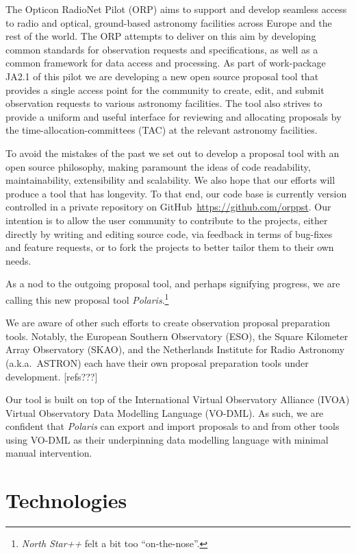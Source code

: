\documentclass[11pt,twoside]{article}
\begin{document}
The Opticon RadioNet Pilot (ORP) aims to support and develop seamless access to radio and optical,
ground-based astronomy facilities across Europe and the rest of the world.
The ORP attempts to deliver on this aim by developing common standards for observation requests and
specifications, as well as a common framework for data access and processing.
As part of work-package JA2.1 of this pilot we are developing a new open source proposal tool that provides
a single access point for the community to create, edit, and submit observation requests to various astronomy
facilities.
The tool also strives to provide a uniform and useful interface for reviewing and allocating proposals by the
time-allocation-committees (TAC) at the relevant astronomy facilities.

To avoid the mistakes of the past we set out to develop a proposal tool with an open source philosophy, making
paramount the ideas of code readability, maintainability, extensibility and scalability.
We also hope that our efforts will produce a tool that has longevity.
To that end, our code base is currently version controlled in a private repository on
GitHub~\url{https://github.com/orppst}.
Our intention is to allow the user community to contribute to the projects, either directly by writing and
editing source code, via feedback in terms of bug-fixes and feature requests, or to fork the projects to
better tailor them to their own needs.

As a nod to the outgoing proposal tool, and perhaps signifying progress, we are calling this new proposal tool
\emph{Polaris}.\footnote{\emph{North Star++} felt a bit too ``on-the-nose''.}

We are aware of other such efforts to create observation proposal preparation tools.
Notably, the European Southern Observatory (ESO), the Square Kilometer Array Observatory (SKAO), and the
Netherlands Institute for Radio Astronomy (a.k.a.\ ASTRON) each have their own proposal preparation tools
under development.
[refs???]

Our tool is built on top of the International Virtual Observatory Alliance (IVOA) Virtual
Observatory Data Modelling Language (VO-DML).
As such, we are confident that \emph{Polaris} can export and import proposals to and from other tools using
VO-DML as their underpinning data modelling language with minimal manual intervention.


\section{Technologies}\label{sec:technologies}
\end{document}
